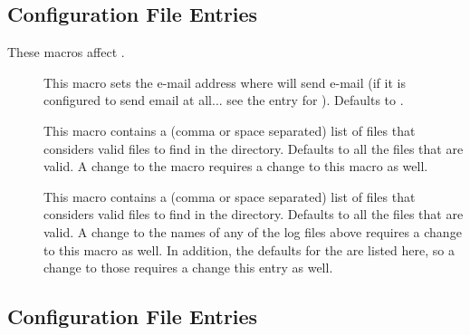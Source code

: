 \subsection{\label{sec:Preen-Config-File-Entries}
 Configuration File Entries}

These macros affect .

\begin{description}

\item[] \label{param:PreenAdmin}  This macro
  sets the e-mail address where  will send e-mail (if
  it is configured to send email at all... see the entry for
  ).  Defaults to .

\item[] \label{param:ValidSpoolFiles}  This
  macro contains a (comma or space separated) list of files that
   considers valid files to find in the 
  directory.  Defaults to all the files that are valid.  A change
  to the  macro requires a change to this
  macro as well.
  
\item[] \label{param:ValidLogFiles} This
  macro contains a (comma or space separated) list of files that
   considers valid files to find in the 
  directory.  Defaults to all the files that are valid.  A change
  to the names of any of the log files above requires a change to this
  macro as well.  In addition, the defaults for the
   are listed here, so a change to
  those requires a change this entry as well.

\end{description}


\subsection{\label{sec:Collector-Config-File-Entries}
 Configuration File Entries}

